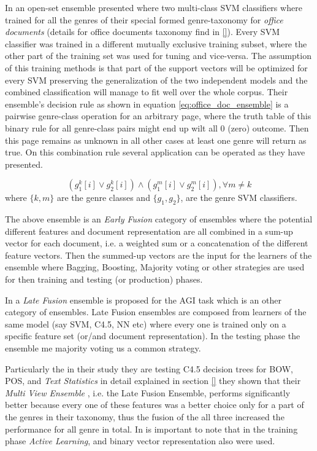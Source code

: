 In \parencite{chen2012genre} an open-set ensemble presented where two multi-class SVM classifiers where trained for all the genres of their special formed genre-taxonomy for \textit{office documents} (details for office documents taxonomy find in \ref{}). Every SVM classifier was trained in a different mutually exclusive training subset, where the other part of the training set was used for tuning and vice-versa. The assumption of this training methods is that part of the support vectors  will be optimized for every SVM preserving the generalization of the two independent models and the combined classification will manage to fit well over the whole corpus. Their ensemble's decision rule as shown in equation \ref{eq:office_doc_ensemble} is a pairwise genre-class operation for an arbitrary page, where the truth table of this binary rule for all genre-class pairs might end up wilt all $0$ (zero) outcome. Then this page remains as unknown in all other cases at least one genre will return as true. On this combination rule several application can be operated as they have presented.


\begin{equation}\label{eq:office_doc_ensemble}
	(g^{k}_{1}[i] \vee g^{k}_{2}[i])  \wedge  (g^{m}_{1}[i] \vee g^{m}_{2}[i]) ,   \forall m \neq k
\end{equation}
where $\{k, m\}$ are the genre classes and $\{g_{1}, g_{2}\}$, are the genre SVM classifiers.

The above ensemble is an \textit{Early Fusion} category of ensembles where the potential different features and document representation are all combined in a sum-up vector for each document, i.e. a weighted sum or a concatenation of the different feature vectors. Then the summed-up vectors are the input for the learners of the ensemble where Bagging, Boosting, Majority voting or other strategies are used for then training and testing (or production) phases.

In \parencite{finn2006learning} a \textit{Late Fusion} ensemble is proposed for the AGI task which is an other category of ensembles. Late Fusion ensembles are composed from learners of the same model (say SVM, C4.5, NN etc) where every one is trained only on a specific feature set (or/and document representation). In the testing phase the ensemble me majority voting us a common strategy. 

Particularly the in their study they are testing C4.5 decision trees for BOW, POS, and \textit{Text Statistics} in detail explained in  section \ref{} they shown that their \textit{Multi View Ensemble }, i.e. the Late Fusion Ensemble, performs significantly better because every one of these features was a better choice only for a part of the genres in their taxonomy, thus the fusion of the all three increased the performance for all genre in total. In is important to note that in the training phase \textit{Active Learning}, and binary vector representation also were used. 

